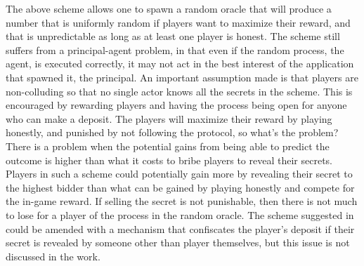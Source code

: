 The above scheme allows one to spawn a random oracle that will produce a number that is uniformly random if players want to maximize their reward, and that is unpredictable as long as at least one player is honest. The scheme still suffers from a principal-agent problem, in that even if the random process, the agent, is executed correctly, it may not act in the best interest of the application that spawned it, the principal. An important assumption made is that players are non-colluding so that no single actor knows all the secrets in the scheme. This is encouraged by rewarding players and having the process being open for anyone who can make a deposit. The players will maximize their reward by playing honestly, and punished by not following the protocol, so what's the problem? 
There is a problem when the potential gains from being able to predict the outcome is higher than what it costs to bribe players to reveal their secrets. Players in such a scheme could potentially gain more by revealing their secret to the highest bidder than what can be gained by playing honestly and compete for the in-game reward. If selling the secret is not punishable, then there is not much to lose for a player of the process in the random oracle. The scheme suggested in \cite{chatterjee_probabilistic_2019} could be amended with a mechanism that confiscates the player's deposit if their secret is revealed by someone other than player themselves, but this issue is not discussed in the work.
